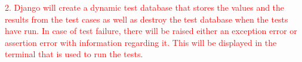 \documentclass{article}
\begin{document}
\newpage
\hspace{-5.3mm}\textcolor{red}{2. Django will create a dynamic test database that stores the values and the results from the test cases as well as destroy the test database when the tests have run. In case of test failure, there will be raised either an exception error or assertion error with information regarding it. This will be displayed in the terminal that is used to run the tests.} 


\newpage

\printindex[Alphabetical]
\end{document}
